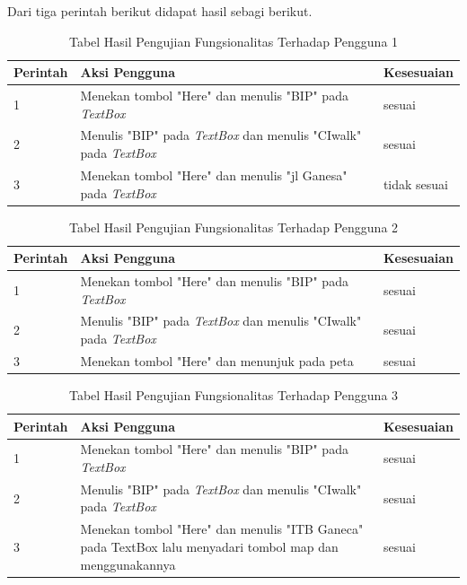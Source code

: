 Dari tiga perintah berikut didapat hasil sebagi berikut.
\begin{table}[h!]
	\centering
		\begin{tabular}{|p{}|p{9cm}|p{2cm}|}\hline
				Perintah & Aksi Pengguna & Kesesuaian \\ \hline
				1 & Menekan tombol "Here" dan menulis "BIP" pada \textit{TextBox} & sesuai \\ \hline
				2 & Menulis "BIP" pada \textit{TextBox} dan menulis "CIwalk" pada \textit{TextBox} & sesuai \\ \hline
				3 & Menekan tombol "Here" dan menulis "jl Ganesa" pada \textit{TextBox} & tidak sesuai \\ \hline
		\end{tabular}
	\caption{Tabel Hasil Pengujian Fungsionalitas Terhadap Pengguna 1}
	\label{tab:TabelHasilPengujianFungsionalitasTerhadapPengguna}
\end{table}

\begin{table}[h!]
	\centering
		\begin{tabular}{|p{}|p{9cm}|p{2cm}|}\hline
				Perintah & Aksi Pengguna & Kesesuaian \\ \hline
				1 & Menekan tombol "Here" dan menulis "BIP" pada \textit{TextBox} & sesuai \\ \hline
				2 & Menulis "BIP" pada \textit{TextBox} dan menulis "CIwalk" pada \textit{TextBox} & sesuai \\ \hline
				3 & Menekan tombol "Here" dan menunjuk pada peta & sesuai \\ \hline
		\end{tabular}
	\caption{Tabel Hasil Pengujian Fungsionalitas Terhadap Pengguna 2}
	\label{tab:TabelHasilPengujianFungsionalitasTerhadapPengguna}
\end{table}

\newpage

\begin{table}[h!]
	\centering
		\begin{tabular}{|p{}|p{9cm}|p{2cm}|}\hline
				Perintah & Aksi Pengguna & Kesesuaian \\ \hline
				1 & Menekan tombol "Here" dan menulis "BIP" pada \textit{TextBox} & sesuai \\ \hline
				2 & Menulis "BIP" pada \textit{TextBox} dan menulis "CIwalk" pada \textit{TextBox} & sesuai \\ \hline
				3 & Menekan tombol "Here" dan menulis "ITB Ganeca" pada TextBox lalu menyadari tombol map dan menggunakannya & sesuai \\ \hline
		\end{tabular}
	\caption{Tabel Hasil Pengujian Fungsionalitas Terhadap Pengguna 3}
	\label{tab:TabelHasilPengujianFungsionalitasTerhadapPengguna}
\end{table}

